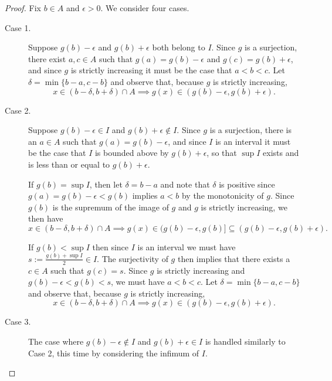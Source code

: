 \documentclass{lew98_solutions}
\begin{document}
\begin{solution}
\begin{proof}
        Fix \( b \in A \) and \( \epsilon > 0 \). We consider four cases.
        \begin{description}
            \item[Case 1.] Suppose \( g(b) - \epsilon \) and \( g(b) + \epsilon \) both belong to \( I \). Since \( g \) is a surjection, there exist \( a, c \in A \) such that \( g(a) = g(b) - \epsilon \) and \( g(c) = g(b) + \epsilon \), and since \( g \) is strictly increasing it must be the case that \( a < b < c \). Let \( \delta = \min \{ b - a, c - b \} \) and observe that, because \( g \) is strictly increasing,
            \[
                x \in (b - \delta, b + \delta) \cap A \implies g(x) \in (g(b) - \epsilon, g(b) + \epsilon).
            \]

            \item[Case 2.] Suppose \( g(b) - \epsilon \in I \) and \( g(b) + \epsilon \not\in I \). Since \( g \) is a surjection, there is an \( a \in A \) such that \( g(a) = g(b) - \epsilon \), and since \( I \) is an interval it must be the case that \( I \) is bounded above by \( g(b) + \epsilon \), so that \( \sup I \) exists and is less than or equal to \( g(b) + \epsilon \).

            If \( g(b) = \sup I \), then let \( \delta = b - a \) and note that \( \delta \) is positive since \( g(a) = g(b) - \epsilon < g(b) \) implies \( a < b \) by the monotonicity of \( g \). Since \( g(b) \) is the supremum of the image of \( g \) and \( g \) is strictly increasing, we then have
            \[
                x \in (b - \delta, b + \delta) \cap A \implies g(x) \in (g(b) - \epsilon, g(b)] \subseteq (g(b) - \epsilon, g(b) + \epsilon).
            \]
            
            If \( g(b) < \sup I \) then since \( I \) is an interval we must have \( s := \tfrac{g(b) + \sup I}{2} \in I \). The surjectivity of \( g \) then implies that there exists a \( c \in A \) such that \( g(c) = s \). Since \( g \) is strictly increasing and \( g(b) - \epsilon < g(b) < s \), we must have \( a < b < c \). Let \( \delta = \min \{ b - a, c - b \} \) and observe that, because \( g \) is strictly increasing,
            \[
                x \in (b - \delta, b + \delta) \cap A \implies g(x) \in (g(b) - \epsilon, g(b) + \epsilon).
            \]

            \item[Case 3.] The case where \( g(b) - \epsilon \not\in I \) and \( g(b) + \epsilon \in I \) is handled similarly to Case 2, this time by considering the infimum of \( I \).


\end{description}
\end{proof}
\end{solution}
\end{document}
